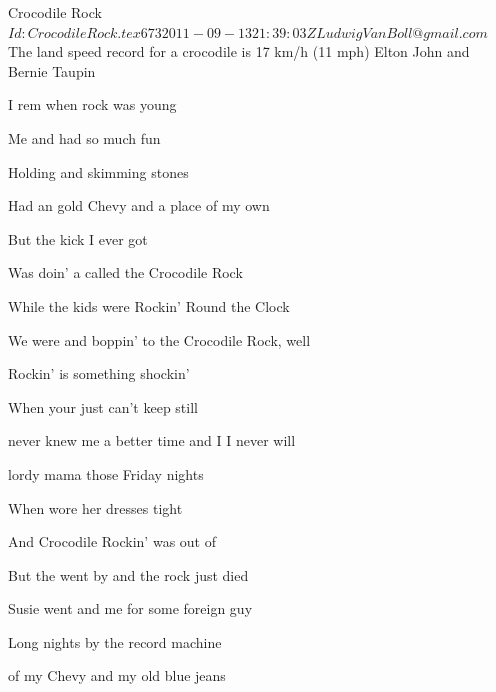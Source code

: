 \begin{SBSong}{Crocodile Rock}
  {$Id: CrocodileRock.tex 673 2011-09-13 21:39:03Z LudwigVanBoll@gmail.com $}
  {The land speed record for a crocodile is 17 km/h (11 mph)}
  {Elton John and Bernie Taupin}
  \begin{SBVerse}
    I rem when rock was young
    
    Me and  had so much fun
    
    Holding  and skimming stones
    
    Had an  gold Chevy and a place of my own
    
    But the  kick I ever got
    
    Was doin' a  called the Crocodile Rock
    
    While the  kids were Rockin' Round the Clock
    
    We were  and boppin' to the Crocodile Rock, well
  \end{SBVerse}
  \begin{SBChorus}
     Rockin' is something shockin'
    
    When your  just can't keep still
    
     never knew me a better time and I  I never will
    
     lordy mama those Friday nights
    
    When  wore her dresses tight
    
    And  Crocodile Rockin' was out of 
    
           
  \end{SBChorus}
  \begin{SBVerse}
    But the  went by and the rock just died
    
    Susie went and  me for some foreign guy
    
    Long nights  by the record machine
    
     of my Chevy and my old blue jeans
    

\end{SBVerse}
\end{SBSong}
